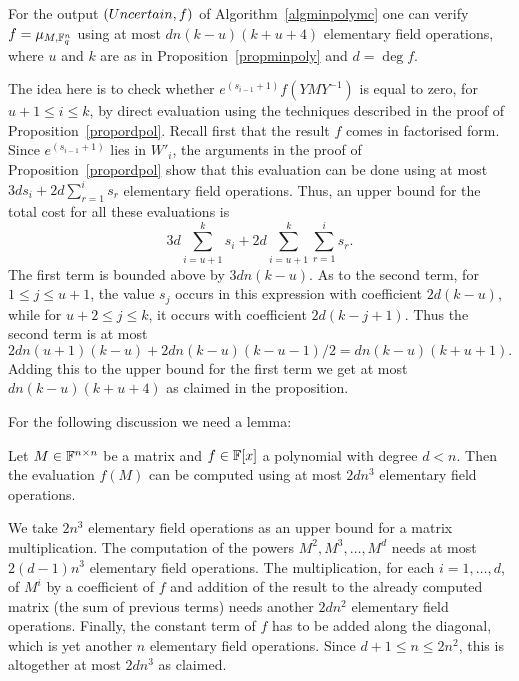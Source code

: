 \begin{Prop}\label{eval}
%
    For the output $(\textsc{Uncertain},f)$ of Algorithm~\ref{algminpolymc} 
    one can verify $f = \mu_{M,\mathbb{F}_q^n}$ using
    at most $dn(k-u)(k+u+4)$ elementary field operations, where $u$ and
    $k$ are as in Proposition~\ref{propminpoly} and $d = \deg f$.
\end{Prop}
\proofbeg
The idea here is to check whether $e^{(s_{i-1}+1)} f(YMY^{-1})$ is equal to zero, for 
$u+1 \le i \le k$,
by direct evaluation using the techniques described in
the proof of Proposition~\ref{propordpol}. Recall first that the
result $f$ comes in factorised form. Since $e^{(s_{i-1}+1)}$ lies
in $W'_i$, the arguments in the proof of Proposition~\ref{propordpol}
show that this evaluation can be done using at most
$3d s_i + 2d \sum_{r=1}^i s_r$ elementary field operations. Thus, an
upper bound for the total cost for all these evaluations is
\[ 3d \sum_{i=u+1}^k s_i + 2d \sum_{i=u+1}^k \sum_{r=1}^i s_r. \]
The first term is bounded above by $3dn(k-u)$. As to the second
term, for $1 \le j \le u+1$, the value $s_j$ occurs in this expression
with coefficient $2d(k-u)$, while for $u+2 \le j \le k$, it occurs
with coefficient $2d(k-j+1)$. Thus the second term is at most
\[ 
2dn(u+1)(k-u) + 2dn(k-u)(k-u-1)/2 = dn(k-u)(k+u+1). 
\]
Adding this to the upper bound for the first term we get at most
$dn(k-u)(k+u+4)$ as claimed in the proposition.
\proofend
\enlargethispage{-2\baselineskip}

\medskip
For the following discussion we need a lemma:

\begin{Lemm}
\label{costpolyeval}
Let $M \in \mathbb{F}^{n \times n}$ be a matrix and $f \in \mathbb{F}[x]$ a polynomial 
with degree $d < n$. Then the evaluation $f(M)$ can be computed using
at most $2dn^3$ elementary field operations.
\end{Lemm}

\proofbeg We take $2n^3$ elementary field operations as an upper bound for a matrix
multiplication. The computation of the powers $M^2, M^3, \ldots, M^d$
needs at most $2(d-1)n^3$ elementary field operations. The
multiplication, for each $i=1,\dots,d$, of $M^i$ by a coefficient of $f$
and addition of the result to the already computed matrix (the sum of previous terms) 
needs another $2dn^2$ elementary field operations. Finally, the
constant term of $f$ has to be added along the diagonal, which is yet
another $n$ elementary field operations. Since $d+1\le n \le 2 n^2$, 
this is altogether at most $2dn^3$
as claimed.
\proofend

